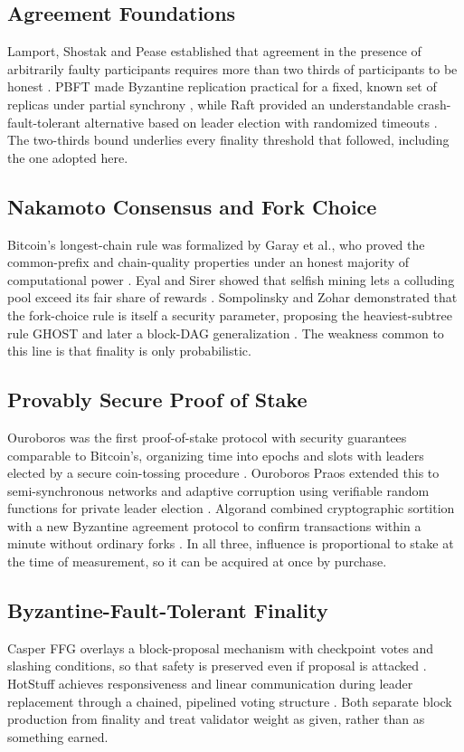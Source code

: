 \documentclass[conference]{IEEEtran}
\begin{document}
\subsection{Agreement Foundations}
Lamport, Shostak and Pease established that agreement in the presence of arbitrarily faulty participants requires more than two thirds of participants to be honest \cite{lamport1982}. PBFT made Byzantine replication practical for a fixed, known set of replicas under partial synchrony \cite{castro1999}, while Raft provided an understandable crash-fault-tolerant alternative based on leader election with randomized timeouts \cite{ongaro2014}. The two-thirds bound underlies every finality threshold that followed, including the one adopted here.

\subsection{Nakamoto Consensus and Fork Choice}
Bitcoin's longest-chain rule \cite{nakamoto2008} was formalized by Garay et al., who proved the common-prefix and chain-quality properties under an honest majority of computational power \cite{garay2015}. Eyal and Sirer showed that selfish mining lets a colluding pool exceed its fair share of rewards \cite{eyal2014}. Sompolinsky and Zohar demonstrated that the fork-choice rule is itself a security parameter, proposing the heaviest-subtree rule GHOST \cite{sompolinsky2015} and later a block-DAG generalization \cite{sompolinsky2018}. The weakness common to this line is that finality is only probabilistic.

\subsection{Provably Secure Proof of Stake}
Ouroboros was the first proof-of-stake protocol with security guarantees comparable to Bitcoin's, organizing time into epochs and slots with leaders elected by a secure coin-tossing procedure \cite{kiayias2017}. Ouroboros Praos extended this to semi-synchronous networks and adaptive corruption using verifiable random functions for private leader election \cite{david2018}. Algorand combined cryptographic sortition with a new Byzantine agreement protocol to confirm transactions within a minute without ordinary forks \cite{gilad2017}. In all three, influence is proportional to stake at the time of measurement, so it can be acquired at once by purchase.

\subsection{Byzantine-Fault-Tolerant Finality}
Casper FFG overlays a block-proposal mechanism with checkpoint votes and slashing conditions, so that safety is preserved even if proposal is attacked \cite{buterin2017}. HotStuff achieves responsiveness and linear communication during leader replacement through a chained, pipelined voting structure \cite{yin2019}. Both separate block production from finality and treat validator weight as given, rather than as something earned.
\end{document}
